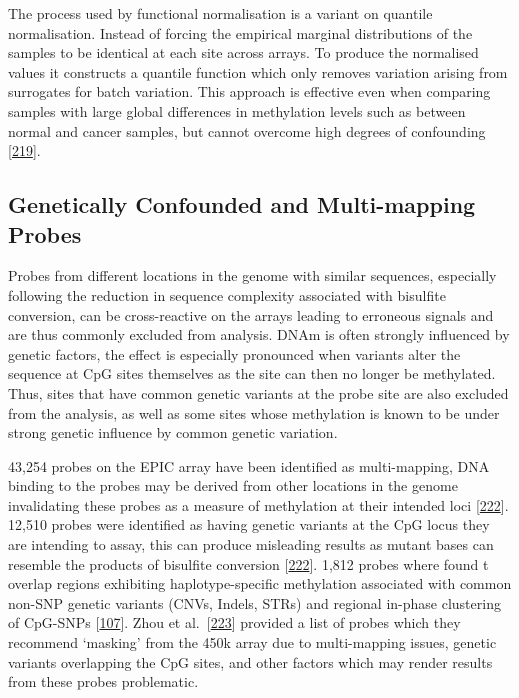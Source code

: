 \documentclass[
]{book}
\begin{document}
The process used by functional normalisation is a variant on quantile normalisation.
Instead of forcing the empirical marginal distributions of the samples to be identical at each site across arrays. To produce the normalised values it constructs a quantile function which only removes variation arising from surrogates for batch variation.
This approach is effective even when comparing samples with large global differences in methylation levels such as between normal and cancer samples, but cannot overcome high degrees of confounding {[}\protect\hyperlink{ref-Fortin2014}{219}{]}.

\hypertarget{genetically-confounded-and-multi-mapping-probes}{%
\subsection{Genetically Confounded and Multi-mapping Probes}\label{genetically-confounded-and-multi-mapping-probes}}

Probes from different locations in the genome with similar sequences, especially following the reduction in sequence complexity associated with bisulfite conversion, can be cross-reactive on the arrays leading to erroneous signals and are thus commonly excluded from analysis.
DNAm is often strongly influenced by genetic factors, the effect is especially pronounced when variants alter the sequence at CpG sites themselves as the site can then no longer be methylated.
Thus, sites that have common genetic variants at the probe site are also excluded from the analysis, as well as some sites whose methylation is known to be under strong genetic influence by common genetic variation.

43,254 probes on the EPIC array have been identified as multi-mapping, DNA binding to the probes may be derived from other locations in the genome invalidating these probes as a measure of methylation at their intended loci {[}\protect\hyperlink{ref-Pidsley2016}{222}{]}.
12,510 probes were identified as having genetic variants at the CpG locus they are intending to assay, this can produce misleading results as mutant bases can resemble the products of bisulfite conversion {[}\protect\hyperlink{ref-Pidsley2016}{222}{]}.
1,812 probes where found t overlap regions exhibiting haplotype-specific methylation associated with common non-SNP genetic variants (CNVs, Indels, STRs) and regional in-phase clustering of CpG-SNPs {[}\protect\hyperlink{ref-Bell2017a}{107}{]}.
Zhou et al.~{[}\protect\hyperlink{ref-Zhou2017}{223}{]} provided a list of probes which they recommend `masking' from the 450k array due to multi-mapping issues, genetic variants overlapping the CpG sites, and other factors which may render results from these probes problematic.
\end{document}
